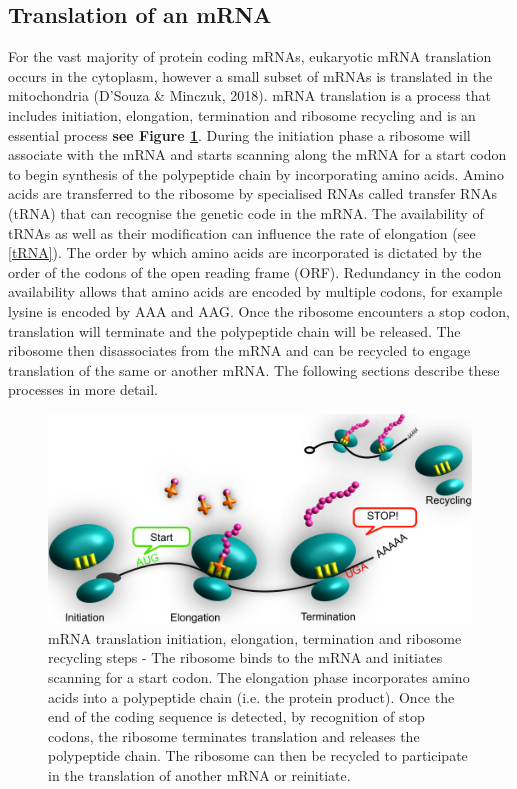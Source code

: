 \documentclass[
  12pt,
  openany]{book}
\begin{document}
\subsection{Translation of an mRNA}

For the vast majority of protein coding mRNAs, eukaryotic mRNA translation occurs in the cytoplasm, however a small subset of mRNAs is translated in the mitochondria (D'Souza \& Minczuk, 2018). mRNA translation is a process that includes initiation, elongation, termination and ribosome recycling and is an essential process \textbf{see Figure \ref{fig:doodlemRNASteps}}. During the initiation phase a ribosome will associate with the mRNA and starts scanning along the mRNA for a start codon to begin synthesis of the polypeptide chain by incorporating amino acids. Amino acids are transferred to the ribosome by specialised RNAs called transfer RNAs (tRNA) that can recognise the genetic code in the mRNA. The availability of tRNAs as well as their modification can influence the rate of elongation (see \ref{tRNA}). The order by which amino acids are incorporated is dictated by the order of the codons of the open reading frame (ORF). Redundancy in the codon availability allows that amino acids are encoded by multiple codons, for example lysine is encoded by AAA and AAG. Once the ribosome encounters a stop codon, translation will terminate and the polypeptide chain will be released. The ribosome then disassociates from the mRNA and can be recycled to engage translation of the same or another mRNA. The following sections describe these processes in more detail.

\begin{figure}
  \includegraphics{./figures/doodleTranslation.pdf}
  \caption{mRNA translation initiation, elongation, termination and ribosome recycling steps - The ribosome binds to the mRNA and initiates scanning for a start codon. The elongation phase incorporates amino acids into a polypeptide chain (i.e. the protein product). Once the end of the coding sequence is detected, by recognition of stop codons, the ribosome terminates translation and releases the polypeptide chain. The ribosome can then be recycled to participate in the translation of another mRNA or reinitiate. \label{fig:doodlemRNASteps}}
\end{figure}
\clearpage
\end{document}
